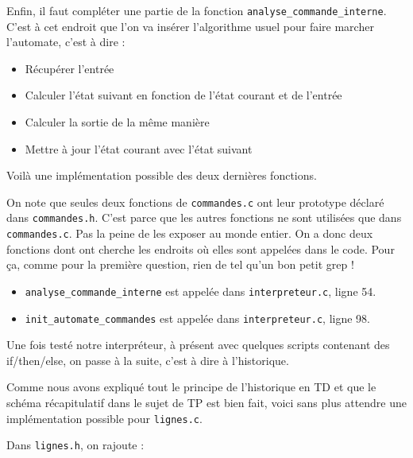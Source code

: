 \documentclass[10pt]{article}
\begin{document}
\begin{enumerate}[label=\textbf{[\alph*]}]
  \vspace{0.2cm}
  Enfin, il faut compléter une partie de la fonction
  \texttt{analyse\_commande\_interne}. C'est à cet endroit que l'on va
  insérer l'algorithme usuel pour faire marcher l'automate, c'est à
  dire :
  \begin{itemize}
  \item Récupérer l'entrée
  \item Calculer l'état suivant en fonction de l'état courant et de
    l'entrée
  \item Calculer la sortie de la même manière
  \item Mettre à jour l'état courant avec l'état suivant
  \end{itemize}

  \vspace{0.2cm}
  Voilà une implémentation possible des deux dernières fonctions.

  

\item On note que seules deux fonctions de \texttt{commandes.c} ont
  leur prototype déclaré dans \texttt{commandes.h}. C'est parce que
  les autres fonctions ne sont utilisées que dans
  \texttt{commandes.c}. Pas la peine de les exposer au monde
  entier. On a donc deux fonctions dont ont cherche les endroits où
  elles sont appelées dans le code. Pour ça, comme pour la première
  question, rien de tel qu'un bon petit grep !

  \vspace{0.2cm}
  \begin{itemize}
  \item \texttt{analyse\_commande\_interne} est appelée dans
    \texttt{interpreteur.c}, ligne 54.
  \item \texttt{init\_automate\_commandes} est appelée dans
    \texttt{interpreteur.c}, ligne 98.
  \end{itemize}
  \newpage

\item Une fois testé notre interpréteur, à présent avec quelques
  scripts contenant des if/then/else, on passe à la suite, c'est à
  dire à l'historique.

  \vspace{0.2cm}
  Comme nous avons expliqué tout le principe de l'historique en TD et
  que le schéma récapitulatif dans le sujet de TP est bien fait, voici
  sans plus attendre une implémentation possible pour
  \texttt{lignes.c}.

  \vspace{0.2cm}
  Dans \texttt{lignes.h}, on rajoute :


\end{enumerate}
\end{document}
